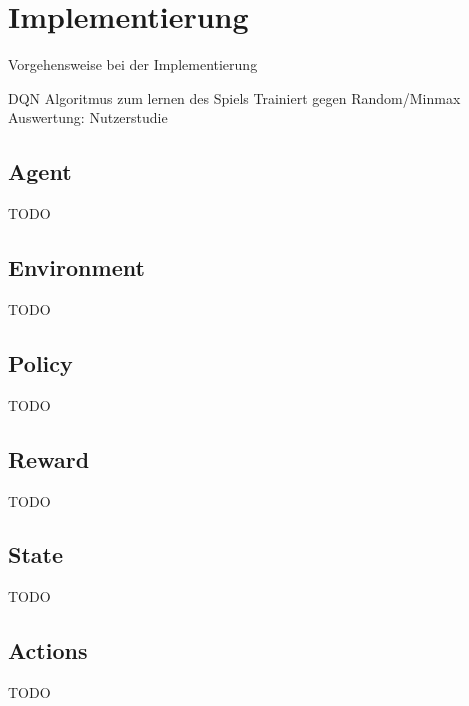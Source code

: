 \chapter{Implementierung}%

\label{cha:Implementierung}

Vorgehensweise bei der Implementierung

\colorbox{red!30}{DQN Algoritmus zum lernen des Spiels}
\colorbox{red!30}{Trainiert gegen Random/Minmax}
\colorbox{red!30}{Auswertung: Nutzerstudie}


\section{Agent}
\colorbox{red!30}{TODO}
\section{Environment}
\colorbox{red!30}{TODO}
\section{Policy}
\colorbox{red!30}{TODO}
\section{Reward}
\colorbox{red!30}{TODO}
\section{State}
\colorbox{red!30}{TODO}
\section{Actions}
\colorbox{red!30}{TODO}

